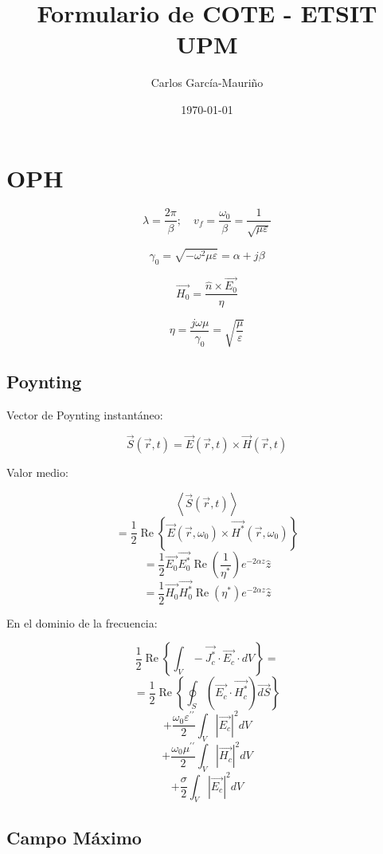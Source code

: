 \documentclass[12pt,a4paper]{article}
\title{Formulario de COTE - ETSIT UPM}
\author{Carlos García-Mauriño}
\date{\today}
\begin{document}
\maketitle

\twocolumn

\section{OPH}
\label{sec:ondas_planas_homogeneas}

\[ \lambda = \frac{2 \pi}{\beta}; \quad v_f = \frac{\omega_0}{\beta}  =
\frac{1}{\sqrt{\mu \varepsilon}} \]

\[ \gamma_0 = \sqrt{-\omega^2 \mu \varepsilon} = \alpha + j \beta \]

\[ \vec{H_0} = \frac{\hat{n} \times \vec{E_0}}{\eta} \]

\[ \eta = \frac{j \omega \mu}{\gamma_0} = \sqrt{\frac{\mu}{\varepsilon}} \]

\subsection{Poynting}
\label{sub:poynting}

Vector de Poynting instantáneo:

\[ \vec{S} ( \vec{r}, t ) = \vec{E} ( \vec{r}, t ) \times \vec{H} ( \vec{r}, t
) \]

Valor medio:

\[ \left< \vec{S} ( \vec{r}, t ) \right> \]
\[ = \frac{1}{2} \operatorname{Re}\left\{ \vec{E}( \vec{r}, \omega_0 ) \times
\vec{H^*} ( \vec{r}, \omega_0)  \right\} \]
\[ = \frac{1}{2} \vec{E_0} \vec{E_0^*} \operatorname{Re}\left( \frac{1}{\eta^*}
\right) e^{-2 \alpha z} \hat{z} \]
\[ = \frac{1}{2} \vec{H_0} \vec{H_0^*} \operatorname{Re}\left( \eta^* \right)
e^{-2 \alpha z} \hat{z} \]

En el dominio de la frecuencia:

\[ \frac{1}{2} \operatorname{Re}\left\{ \int_V - \vec{J_{c}^*} \cdot
\vec{E_c} \cdot dV \right\} = \]
\[ = \frac{1}{2} \operatorname{Re}\left\{ \oint_S \left(\vec{E_{c}} \cdot
\vec{H_c^*} \right) \vec{dS} \right\} \] 
\[ + \frac{\omega_0 \varepsilon^{\prime\prime}}{2} \int_V | \vec{E_c} |^2 dV \]
\[ + \frac{\omega_0 \mu^{\prime\prime}}{2} \int_V | \vec{H_c} |^2 dV \]
\[ + \frac{\sigma}{2} \int_V | \vec{E_c} |^2 dV \]

\subsection{Campo Máximo}
\label{sub:campo_maximo}
\end{document}
